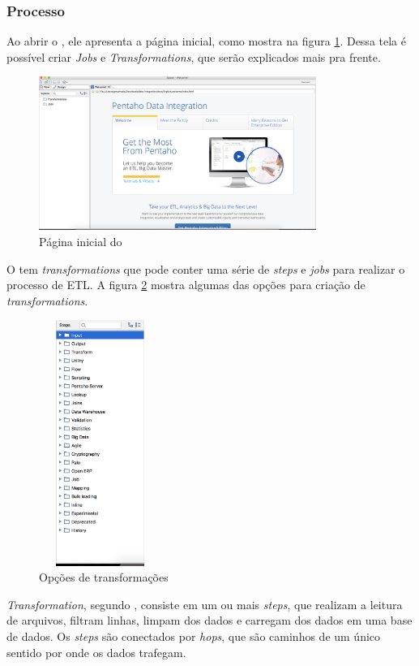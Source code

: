 \subsubsection{Processo}
Ao abrir o \pdi, ele apresenta a página inicial, como mostra na figura \ref{initialpdi}. Dessa tela é possível criar \textit{Jobs} e \textit{Transformations}, que serão explicados mais pra frente. 
\begin{figure}[H]
\centering
\includegraphics[height=5cm]{imagens/pagina_principal_pentaho.png}
\caption{Página inicial do \pdi}
\label{initialpdi}
\end{figure}
O \pdi tem \textit{transformations} que pode conter uma série de \textit{steps} e \textit{jobs} para realizar o processo de ETL. A figura \ref{transformationOptions} mostra algumas das opções para criação de \textit{transformations}.
\begin{figure}[H]
\centering
\includegraphics[width=4cm, height=8cm]{imagens/opcoes_de_transformacao.png}
\caption{Opções de transformações}
\label{transformationOptions}

\end{figure}
\textit{Transformation}, segundo , consiste em um ou mais \textit{steps}, que realizam a leitura de arquivos, filtram linhas, limpam dos dados e carregam dos dados em uma base de dados. Os \textit{steps} são conectados por \textit{hops}, que são caminhos de um único sentido por onde os dados trafegam. 

